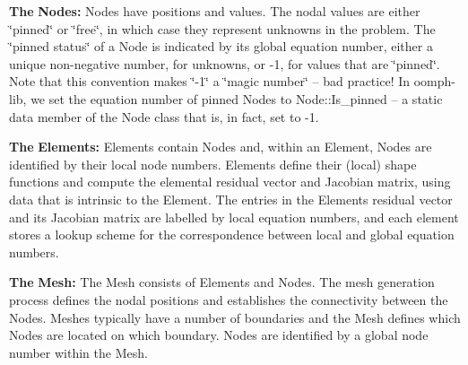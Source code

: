 \begin{DoxyItemize}
\item {\bfseries The} {\bfseries Nodes\+:} Nodes have positions and values. The nodal values are either \char`\"{}pinned\char`\"{} or \char`\"{}free\char`\"{}, in which case they represent unknowns in the problem. The \char`\"{}pinned status\char`\"{} of a Node is indicated by its global equation number, either a unique non-\/negative number, for unknowns, or -\/1, for values that are \char`\"{}pinned\char`\"{}. Note that this convention makes \char`\"{}-\/1\char`\"{} a \char`\"{}magic number\char`\"{} -- bad practice! In {\ttfamily oomph-\/lib}, we set the equation number of pinned Nodes to {\ttfamily Node\+::\+Is\+\_\+pinned} -- a static data member of the Node class that is, in fact, set to -\/1.
\item {\bfseries The} {\bfseries Elements\+:} Elements contain Nodes and, within an Element, Nodes are identified by their local node numbers. Elements define their (local) shape functions and compute the elemental residual vector and Jacobian matrix, using data that is intrinsic to the Element. The entries in the Element\textquotesingle{}s residual vector and its Jacobian matrix are labelled by local equation numbers, and each element stores a lookup scheme for the correspondence between local and global equation numbers.
\item {\bfseries The} {\bfseries Mesh\+:} The Mesh consists of Elements and Nodes. The mesh generation process defines the nodal positions and establishes the connectivity between the Nodes. Meshes typically have a number of boundaries and the Mesh defines which Nodes are located on which boundary. Nodes are identified by a global node number within the Mesh.
\end{DoxyItemize}


